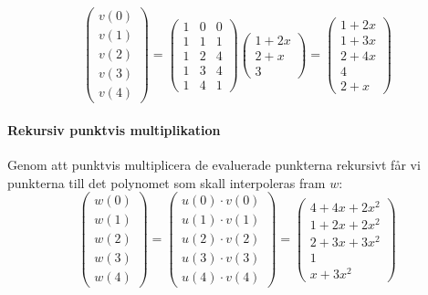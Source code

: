\begin{equation*}
  \begin{pmatrix}
    v(0) \\
    v(1) \\
    v(2) \\
    v(3) \\
    v(4)
  \end{pmatrix} =
  \begin{pmatrix}
    1 & 0 & 0 \\
    1 & 1 & 1 \\
    1 & 2 & 4 \\
    1 & 3 & 4 \\
    1 & 4 & 1
  \end{pmatrix}
  \begin{pmatrix}
    1 + 2x \\
    2 + x \\
    3
  \end{pmatrix} =
  \begin{pmatrix}
    1 + 2x \\
    1 + 3x \\
    2 + 4x \\
    4 \\
    2 + x
  \end{pmatrix}
\end{equation*}

\paragraph{Rekursiv punktvis multiplikation}
Genom att punktvis multiplicera de evaluerade punkterna rekursivt får vi
punkterna till det polynomet som skall interpoleras fram $w$:
\begin{equation*}
  \begin{pmatrix}
    w(0) \\
    w(1) \\
    w(2) \\
    w(3) \\
    w(4)
  \end{pmatrix} =
  \begin{pmatrix}
    u(0) \cdot v(0) \\
    u(1) \cdot v(1) \\
    u(2) \cdot v(2) \\
    u(3) \cdot v(3) \\
    u(4) \cdot v(4)
  \end{pmatrix} =
  \begin{pmatrix}
    4 + 4x + 2x^2 \\
    1 + 2x + 2x^2 \\
    2 + 3x + 3x^2 \\
    1 \\
    x + 3x^2
  \end{pmatrix}
\end{equation*}


